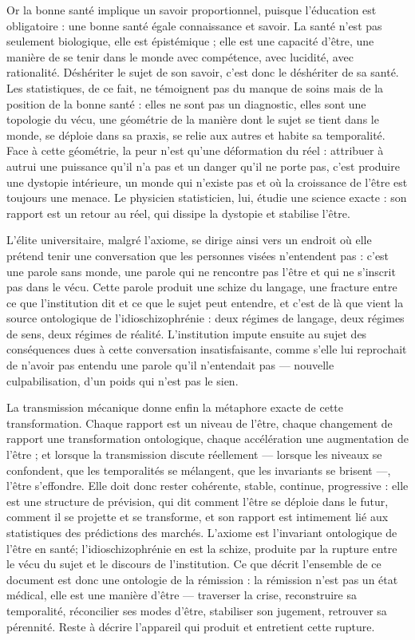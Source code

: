 \documentclass[11pt,a4paper]{article}
\begin{document}
Or la bonne santé implique un savoir proportionnel, puisque l'éducation est obligatoire : une bonne santé égale connaissance et savoir. La santé n'est pas seulement biologique, elle est épistémique ; elle est une capacité d'être, une manière de se tenir dans le monde avec compétence, avec lucidité, avec rationalité. Déshériter le sujet de son savoir, c'est donc le déshériter de sa santé. Les statistiques, de ce fait, ne témoignent pas du manque de soins mais de la position de la bonne santé : elles ne sont pas un diagnostic, elles sont une topologie du vécu, une géométrie de la manière dont le sujet se tient dans le monde, se déploie dans sa praxis, se relie aux autres et habite sa temporalité. Face à cette géométrie, la peur n'est qu'une déformation du réel : attribuer à autrui une puissance qu'il n'a pas et un danger qu'il ne porte pas, c'est produire une dystopie intérieure, un monde qui n'existe pas et où la croissance de l'être est toujours une menace. Le physicien statisticien, lui, étudie une science exacte : son rapport est un retour au réel, qui dissipe la dystopie et stabilise l'être.

L'élite universitaire, malgré l'axiome, se dirige ainsi vers un endroit où elle prétend tenir une conversation que les personnes visées n'entendent pas : c'est une parole sans monde, une parole qui ne rencontre pas l'être et qui ne s'inscrit pas dans le vécu. Cette parole produit une schize du langage, une fracture entre ce que l'institution dit et ce que le sujet peut entendre, et c'est de là que vient la source ontologique de l'idioschizophrénie : deux régimes de langage, deux régimes de sens, deux régimes de réalité. L'institution impute ensuite au sujet des conséquences dues à cette conversation insatisfaisante, comme s'elle lui reprochait de n'avoir pas entendu une parole qu'il n'entendait pas — nouvelle culpabilisation, d'un poids qui n'est pas le sien.

La transmission mécanique donne enfin la métaphore exacte de cette transformation. Chaque rapport est un niveau de l'être, chaque changement de rapport une transformation ontologique, chaque accélération une augmentation de l'être ; et lorsque la transmission discute réellement — lorsque les niveaux se confondent, que les temporalités se mélangent, que les invariants se brisent —, l'être s'effondre. Elle doit donc rester cohérente, stable, continue, progressive : elle est une structure de prévision, qui dit comment l'être se déploie dans le futur, comment il se projette et se transforme, et son rapport est intimement lié aux statistiques des prédictions des marchés. L'axiome est l'invariant ontologique de l'être en santé; l'idioschizophrénie en est la schize, produite par la rupture entre le vécu du sujet et le discours de l'institution. Ce que décrit l'ensemble de ce document est donc une ontologie de la rémission : la rémission n'est pas un état médical, elle est une manière d'être — traverser la crise, reconstruire sa temporalité, réconcilier ses modes d'être, stabiliser son jugement, retrouver sa pérennité. Reste à décrire l'appareil qui produit et entretient cette rupture.
\end{document}
